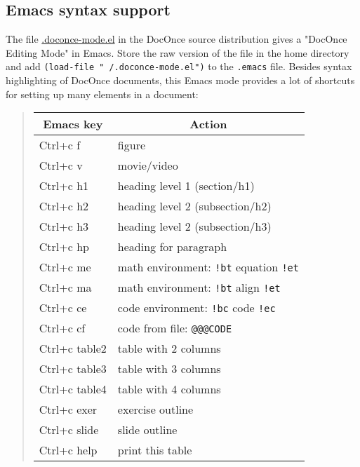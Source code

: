 \documentclass[%
oneside,                 %
final,                   %
10pt]{article}
\newcounter{doconce:movie:counter}
\begin{document}
\subsection{Emacs syntax support}
The file \href{{https://github.com/doconce/doconce/blob/master/misc/.doconce-mode.el}}{.doconce-mode.el}
in the DocOnce source distribution gives a "DocOnce Editing Mode" in
Emacs. Store the raw version of the file in the home directory and add
\texttt{(load-file "~/.doconce-mode.el")} to the \texttt{.emacs} file.
Besides syntax highlighting of DocOnce documents, this Emacs mode
provides a lot of shortcuts for setting up many elements in a document:
\begin{quote}
\begin{tabular}{ll}
\hline
\multicolumn{1}{c}{ Emacs key } & \multicolumn{1}{c}{ Action } \\
\hline
Ctrl+c f      & figure                                           \\
Ctrl+c v      & movie/video                                      \\
Ctrl+c h1     & heading level 1 (section/h1)                     \\
Ctrl+c h2     & heading level 2 (subsection/h2)                  \\
Ctrl+c h3     & heading level 2 (subsection/h3)                  \\
Ctrl+c hp     & heading for paragraph                            \\
Ctrl+c me     & math environment: \Verb?!bt? equation \Verb?!et? \\
Ctrl+c ma     & math environment: \Verb?!bt? align \Verb?!et?    \\
Ctrl+c ce     & code environment: \Verb?!bc? code \Verb?!ec?     \\
Ctrl+c cf     & code from file: \texttt{@@@CODE}                   \\
Ctrl+c table2 & table with 2 columns                             \\
Ctrl+c table3 & table with 3 columns                             \\
Ctrl+c table4 & table with 4 columns                             \\
Ctrl+c exer   & exercise outline                                 \\
Ctrl+c slide  & slide outline                                    \\
Ctrl+c help   & print this table                                 \\
\hline
\end{tabular}
\end{quote}
\noindent
\end{document}
